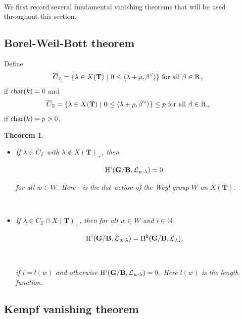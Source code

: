 \documentclass[sn-mathphys-num]{sn-jnl}%
\newcommand{\Ll}{\mathcal L}
\newcommand{\bg}{\mathbf G}
\newcommand{\fb}{\mathbf B}
\newcommand{\bt}{\mathbf T}
\newtheorem{theorem}{Theorem}[section]
\theoremstyle{definition}
\begin{document}
\

We first record several fundamental vanishing theorems that will be used throughout this section.

\subsection{Borel-Weil-Bott theorem}\label{th:BWB_van}

Define $$\overline C _{\mathbb Z}=\{\lambda\in X({\bt}) \ | \ 0\leq \langle \lambda + \rho,\beta ^{\vee}\rangle\} \ {\rm for \ all} \ \beta \in {\rm R}_+$$ if ${\rm char}(k)=0$ and $$\overline C _{\mathbb Z}=\{\lambda\in X({\bt}) \ | \ 0\leq \langle \lambda + \rho,\beta ^{\vee}\rangle\}\leq p \ {\rm for \ all} \ \beta \in {\rm R}_+$$ if ${\rm char}(k)=p>0$.

\begin{theorem}\cite[Part II, Corollary 5.5]{Jan}\label{th:Bott-Demazure_th}

\begin{itemize}[(a)]

\item[(a)] If $\lambda \in \overline C _{\mathbb Z}$ with $\lambda \notin X({\bt})_+$, then 

$$
{\rm H}^i({ \bg}/{\fb},\Ll _{w\cdot\lambda})=0
$$

for all $w\in W$. Here $\cdot$ is the dot--action of the Weyl group $W$ on 
$X({\bt})$.

\

\item[(b)] If $\lambda \in  \overline C _{\mathbb Z}\cap  X({\bt})_+$, then 
for all $w\in W$ and $i\in \mathbb N$

$$
{\rm H}^i({ \bg}/{\fb},\Ll _{w\cdot \lambda})={\rm H}^0({ \bg}/{\fb},\Ll _{\lambda}),
$$

\

if $i=l(w)$ and otherwise ${\rm H}^i({ \bg}/{\fb},\Ll _{w\cdot \lambda})=0$. Here $l(w)$ is the length function.

\end{itemize}

\end{theorem}

\subsection{Kempf vanishing theorem}\label{subsec:Kempfvan}
\end{document}
